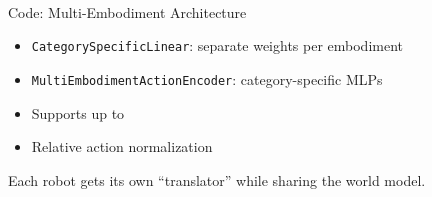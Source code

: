 
\begin{frame}[plain]
\begin{center}
\vfill
{\Huge{}}\\[1em]
{\large{}}
\vfill
\end{center}
\end{frame}

\begin{frame}{Code: Multi-Embodiment Architecture}
\begin{methodbox}
\begin{itemize}
    \item \texttt{CategorySpecificLinear}:
          separate weights per embodiment
    \item \texttt{MultiEmbodimentActionEncoder}:
          category-specific MLPs
    \item Supports up to 
    \item Relative action normalization
\end{itemize}
\end{methodbox}

\vspace{0.5em}
\begin{softbox}
 Each robot gets its own
``translator'' while sharing the world model.
\end{softbox}
\end{frame}

